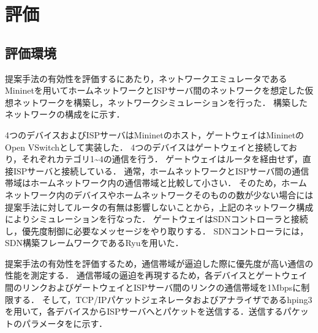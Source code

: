 \documentclass[a4paper,11pt,uplatex]{ujreport}
\begin{document}

\chapter{評価}
\label{chap:評価}

\section{評価環境}
\label{評価環境}

  提案手法の有効性を評価するにあたり，ネットワークエミュレータであるMininetを用いてホームネットワークとISPサーバ間のネットワークを想定した仮想ネットワークを構築し，ネットワークシミュレーションを行った．
  構築したネットワークの構成をに示す．\par


  4つのデバイスおよびISPサーバはMininetのホスト，ゲートウェイはMininetのOpen VSwitchとして実装した．
  4つのデバイスはゲートウェイと接続しており，それぞれカテゴリ1\textasciitilde4の通信を行う．
  ゲートウェイはルータを経由せず，直接ISPサーバと接続している．
  通常，ホームネットワークとISPサーバ間の通信帯域はホームネットワーク内の通信帯域と比較して小さい．
  そのため，ホームネットワーク内のデバイスやホームネットワークそのものの数が少ない場合には提案手法に対してルータの有無は影響しないことから，上記のネットワーク構成によりシミュレーションを行なった．
  ゲートウェイはSDNコントローラと接続し，優先度制御に必要なメッセージをやり取りする．
  SDNコントローラには，SDN構築フレームワークであるRyuを用いた．\par

  提案手法の有効性を評価するため，通信帯域が逼迫した際に優先度が高い通信の性能を測定する．
  通信帯域の逼迫を再現するため，各デバイスとゲートウェイ間のリンクおよびゲートウェイとISPサーバ間のリンクの通信帯域を1Mbpsに制限する．
  そして，TCP/IPパケットジェネレータおよびアナライザであるhping3を用いて，各デバイスからISPサーバへとパケットを送信する．送信するパケットのパラメータをに示す．
\end{document}
